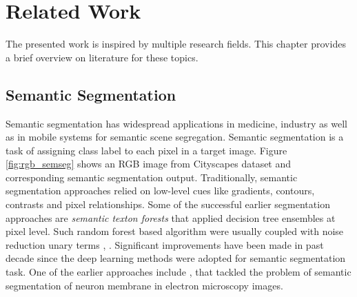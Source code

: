 
\chapter{Related Work}
\label{sec:related-work}

The presented work is inspired by multiple research fields. This chapter provides a brief overview on literature for these topics.


\section{Semantic Segmentation}

Semantic segmentation has widespread applications in medicine, industry as well as in mobile systems for semantic scene segregation. Semantic segmentation is a task of assigning class label to each pixel in a target image. Figure \ref{fig:rgb_semseg} shows an RGB image from Cityscapes dataset \cite{Cordts2015} and corresponding semantic segmentation output. Traditionally, semantic segmentation approaches relied on low-level cues like gradients, contours, contrasts and pixel relationships. Some of the successful earlier segmentation approaches are \textit{semantic texton forests} that applied decision tree ensembles at pixel level. Such random forest  based algorithm were usually coupled with noise reduction unary terms  \cite{Shotton2008}, \cite{Sturgess2009}. Significant improvements have been made in past decade since the deep learning methods were adopted for semantic segmentation task. One of the earlier approaches include \cite{Ciresan2012}, that tackled the problem of semantic segmentation of neuron membrane in electron microscopy images.


